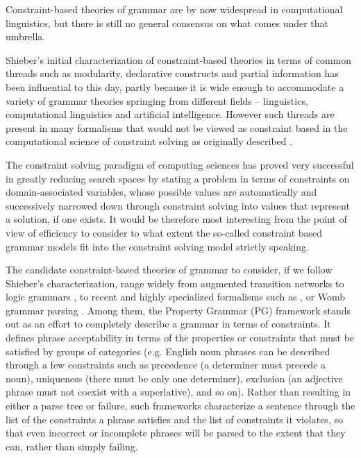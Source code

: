 \documentclass{llncs}
\begin{document}
Constraint-based theories of grammar  are by now widespread in computational linguistics, but there is still no general consensus on what comes under that umbrella. 

Shieber's initial characterization of constraint-based theories in terms of common threads such as modularity, declarative constructs and partial information  \cite{Shieber} has been influential to this day, partly because it is wide enough to accommodate a variety of grammar theories springing from different fields -- linguistics, computational linguistics and artificial intelligence. However such threads  are present in many formalisms that would not be viewed as constraint based in the computational science of constraint solving  as  originally described \cite{Waltz}.

The constraint solving paradigm of computing sciences has proved very successful in greatly reducing search spaces by stating a problem in terms of constraints on domain-associated variables, whose possible values are automatically and successively narrowed down through constraint solving into values that represent a solution, if one exists. It would be therefore most interesting from the point of view of efficiency to consider to what extent the so-called constraint based grammar models fit into the constraint solving model strictly speaking.

The candidate constraint-based theories of grammar to consider, if we follow Shieber's characterization,   range widely from augmented transition networks \cite{Woods1970} to logic grammars \cite{AD89}, to  recent and highly specialized formalisms such as \cite{Muresan2010}, or Womb grammar parsing \cite{DM12}.
Among them, the Property Grammar (PG) framework \cite{Blache} stands out as an effort to completely describe a grammar in terms of constraints. It  defines phrase acceptability in terms of the properties or constraints that must be satisfied by groups of categories (e.g. English noun phrases can be described through a few constraints such as precedence (a determiner must precede a noun), uniqueness (there must be only one determiner), exclusion (an adjective phrase must not coexist with a superlative), and so on). Rather than resulting in either a parse tree or failure, such frameworks characterize a sentence through the list of the constraints a phrase satisfies and the list of constraints it violates, so that even incorrect or incomplete phrases will be parsed to the extent that they can, rather than simply failing.
\end{document}
